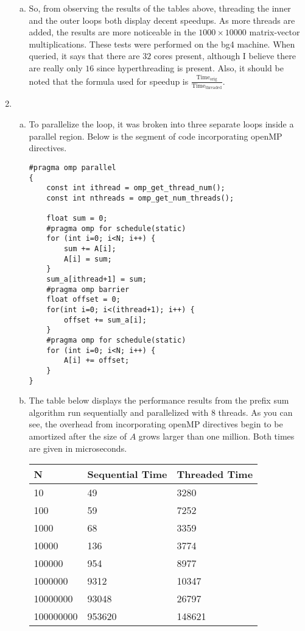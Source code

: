 \documentclass[10pt]{article} %
\begin{document}
\begin{enumerate}[1.]
\begin{enumerate}[(a)]
\item %

So, from observing the results of the tables above, threading the inner and the outer loops both display decent speedups.  As more threads are added, the results are more noticeable in the $1000 \times 10000$ matrix-vector multiplications.  These tests were performed on the bg4 machine.  When queried, it says that there are $32$ cores present, although I believe there are really only $16$ since hyperthreading is present.  Also, it should be noted that the formula used for speedup is $\frac{\text{Time}_{\text{orig}}}{\text{Time}_{\text{threaded}}}$.  

\end{enumerate}

\item %

\begin{enumerate}[(a)]
\item %

To parallelize the loop, it was broken into three separate loops inside a parallel region.  Below is the segment of code incorporating openMP directives.  

\begin{verbatim}
#pragma omp parallel
{
    const int ithread = omp_get_thread_num();
    const int nthreads = omp_get_num_threads();

    float sum = 0;
    #pragma omp for schedule(static)
    for (int i=0; i<N; i++) {
        sum += A[i];
        A[i] = sum;
    }
    sum_a[ithread+1] = sum;
    #pragma omp barrier
    float offset = 0;
    for(int i=0; i<(ithread+1); i++) {
        offset += sum_a[i];
    }
    #pragma omp for schedule(static)
    for (int i=0; i<N; i++) {
        A[i] += offset;
    }
}
\end{verbatim}

\item %

The table below displays the performance results from the prefix sum algorithm run sequentially and parallelized with $8$ threads.  As you can see, the overhead from incorporating openMP directives begin to be amortized after the size of $A$ grows larger than one million.  Both times are given in microseconds.  

\begin{center}
\begin{tabular}{| l | l | l |}
\hline
\textbf{N} & \textbf{Sequential Time} & \textbf{Threaded Time} \\
\hline
10 & 49 & 3280 \\
100 & 59 & 7252 \\
1000 & 68 & 3359 \\
10000 & 136 & 3774 \\
100000 & 954 & 8977 \\
1000000 & 9312 & 10347 \\
10000000 & 93048 & 26797 \\
100000000 & 953620 & 148621 \\
\hline
\end{tabular}
\end{center}


\end{enumerate}
\end{enumerate}
\end{document}
